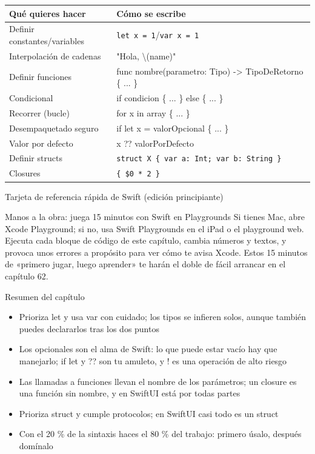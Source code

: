 \begin{center}
\begin{tabularx}{\linewidth}{|X|X|}
\hline
\textbf{Qué quieres hacer} & \textbf{Cómo se escribe} \tabularnewline
\hline
Definir constantes/variables & \texttt{let x = 1}/\texttt{var x = 1} \tabularnewline
Interpolación de cadenas & "Hola, \textbackslash{}(name)" \tabularnewline
Definir funciones & func nombre(parametro: Tipo) -> TipoDeRetorno \{ ... \} \tabularnewline
Condicional & if condicion \{ ... \} else \{ ... \} \tabularnewline
Recorrer (bucle) & for x in array \{ ... \} \tabularnewline
Desempaquetado seguro & if let x = valorOpcional \{ ... \} \tabularnewline
Valor por defecto & x ?? valorPorDefecto \tabularnewline
Definir structs & \texttt{struct X \{ var a: Int; var b: String \}} \tabularnewline
Closures & \texttt{\{ \$0 * 2 \}} \tabularnewline
\hline
\end{tabularx}
\end{center}

\begin{center}\small\color{gray}Tarjeta de referencia rápida de Swift (edición principiante)\end{center}

\begin{tcbpractice}{Manos a la obra: juega 15 minutos con Swift en Playgrounds}
Si tienes Mac, abre Xcode Playground; si no, usa Swift Playgrounds en el iPad o el playground web. Ejecuta cada bloque de código de este capítulo, cambia números y textos, y provoca unos errores a propósito para ver cómo te avisa Xcode. Estos 15 minutos de «primero jugar, luego aprender» te harán el doble de fácil arrancar en el capítulo 62.

\end{tcbpractice}

\begin{tcbsummary}{Resumen del capítulo}
\begin{itemize}
  \item Prioriza let y usa var con cuidado; los tipos se infieren solos, aunque también puedes declararlos tras los dos puntos
  \item Los opcionales son el alma de Swift: lo que puede estar vacío hay que manejarlo; if let y ?? son tu amuleto, y ! es una operación de alto riesgo
  \item Las llamadas a funciones llevan el nombre de los parámetros; un closure es una función sin nombre, y en SwiftUI está por todas partes
  \item Prioriza struct y cumple protocolos; en SwiftUI casi todo es un struct
  \item Con el 20 \% de la sintaxis haces el 80 \% del trabajo: primero úsalo, después domínalo
\end{itemize}

\end{tcbsummary}
